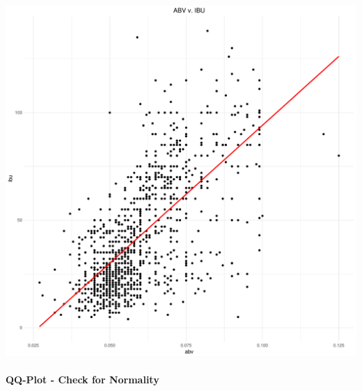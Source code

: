 \documentclass[]{article}
\let\oldparagraph\paragraph
\renewcommand{\paragraph}[1]{\oldparagraph{#1}\mbox{}}
\begin{document}
\begin{center}\includegraphics{Analysis_Final_files/figure-latex/unnamed-chunk-23-1} \end{center}

\paragraph{QQ-Plot - Check for
Normality}\label{qq-plot---check-for-normality}
\end{document}
